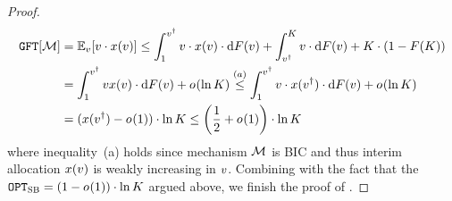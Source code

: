 \begin{proof}
    \begin{align*}
        \GFT{\mech} & = \expect[\val]{\val\cdot \alloc(\val)} 
        \leq
        \displaystyle\int_1^{\val\primed} \val\cdot \alloc(\val)\cdot \d \buyercdf(\val)
        +
        \displaystyle\int_{\val\primed}^{\constantH} \val\cdot \d \buyercdf(\val)
        + \constantH\cdot (1 - \buyercdf(\constantH))
        \\
        &{}=
        \displaystyle\int_1^{\val\primed} \val\alloc(\val)\cdot \d \buyercdf(\val)
        +
        o_{}(\ln\constantH)
        \overset{(a)}{\leq} 
        \displaystyle\int_1^{\val\primed} \val\cdot \alloc(\val\primed)\cdot \d \buyercdf(\val)
        +
        o_{}(\ln\constantH)
        \\
        & {} =
        (\alloc(\val\primed) - o_{}(1))\cdot \ln\constantH
        \leq 
        \left(\frac{1}{2} + o_{}(1)\right)\cdot \ln\constantH
    \end{align*}
    where inequality~(a) holds since mechanism $\mathcal{M}$ is BIC and thus interim allocation $x(v)$ is weakly increasing in $v$.
    Combining with the fact that the {\SecondBest} $\texttt{OPT}_{\textsc{SB}} = (1 - o_{}(1))\cdot \ln K$ argued above, we finish the proof of .
\end{proof}
